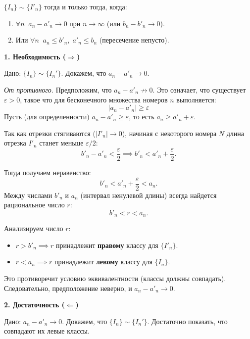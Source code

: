 \begin{tcolorbox}
    $\{I_n\} \sim \{I'_n\}$ тогда и только тогда, когда:
    \begin{enumerate}
        \item $\forall n \;\; a_n - a'_n \to 0$ при $n \to \infty$ (или $b_n - b'_n \to 0$).
        \item Или $\forall n \;\; a_n \le b'_n, \; a'_n \le b_n$ (пересечение непусто).
    \end{enumerate}
\end{tcolorbox}

\begin{tcolorbox}[title=Доказательство Теоремы, breakable]
    \textbf{1. Необходимость ($\Rightarrow$)}
    
    Дано: $\{ I_n \} \sim \{ I_n' \}$. Докажем, что $a_n - a'_n \to 0$.
    
    \textit{От противного.} Предположим, что $a_n - a'_n \nrightarrow 0$.
    Это означает, что существует $\varepsilon > 0$, такое что для бесконечного множества номеров $n$ выполняется:
    \[ |a_n - a'_n| \ge \varepsilon \]
    Пусть (для определенности) $a_n - a'_n \ge \varepsilon$, то есть $a_n \ge a'_n + \varepsilon$.
    
    Так как отрезки стягиваются ($|I'_n| \to 0$), начиная с некоторого номера $N$ длина отрезка $I'_n$ станет меньше $\varepsilon/2$:
    \[ b'_n - a'_n < \frac{\varepsilon}{2} \implies b'_n < a'_n + \frac{\varepsilon}{2}. \]
    
    Тогда получаем неравенство:
    \[ b'_n < a'_n + \frac{\varepsilon}{2} < a_n. \]
    Между числами $b'_n$ и $a_n$ (интервал ненулевой длины) всегда найдется рациональное число $r$:
    \[ b'_n < r < a_n. \]
    
    Анализируем число $r$:
    \begin{itemize}
        \item $r > b'_n \implies r$ принадлежит \textbf{правому} классу для $\{I'_n\}$.
        \item $r < a_n \implies r$ принадлежит \textbf{левому} классу для $\{I_n\}$.
    \end{itemize}
    Это противоречит условию эквивалентности (классы должны совпадать).
    Следовательно, предположение неверно, и $a_n - a'_n \to 0$.

    \medskip

    \textbf{2. Достаточность ($\Leftarrow$)}
    
    Дано: $a_n - a'_n \to 0$. Докажем, что $\{ I_n \} \sim \{ I_n' \}$.
    Достаточно показать, что совпадают их левые классы.
    

\end{tcolorbox}
